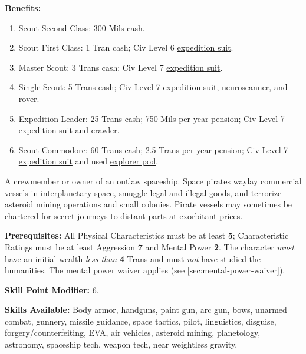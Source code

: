 \pagebreak[2]
\textbf{Benefits:}
\begin{enumerate}
\item Scout Second Class: 300 Mils cash.
\item Scout First Class: 1 Tran cash; Civ Level 6 \hyperlink{tag:expedsuit}{expedition suit}.
\item Master Scout: 3 Trans cash; Civ Level 7 \hyperlink{tag:expedsuit}{expedition suit}.
\item Single Scout: 5 Trans cash; Civ Level 7 \hyperlink{tag:expedsuit}{expedition suit},
  \hypertarget{tag:neuroscanner}{neuroscanner}, and \hypertarget{tag:rover}{rover}.
\item Expedition Leader: 25 Trans cash; 750 Mils per year pension; Civ
  Level 7 \hyperlink{tag:expedsuit}{expedition suit} and \hyperlink{crawler}{crawler}.
\item Scout Commodore: 60 Trans cash; 2.5 Trans per year pension; Civ
  Level 7 \hyperlink{tag:expedsuit}{expedition suit} and used \hyperlink{tag:pod-explorer}{explorer pod}.
\end{enumerate}

\bigskip

\pagebreak[2]

\label{sec:prof-space-pirate}

A crewmember or owner of an outlaw spaceship. Space pirates waylay
commercial vessels in interplanetary space, smuggle legal and illegal
goods, and terrorize asteroid mining operations and small colonies.
Pirate vessels may sometimes be chartered for secret journeys to
distant parts at exorbitant prices.

\textbf{Prerequisites:} All Physical Characteristics must be at least
\textbf{5}; Characteristic Ratings must be at least Aggression
\textbf{7} and Mental Power \textbf{2}. The character \emph{must} have
an initial wealth \emph{less than} \textbf{4} Trans and must
\emph{not} have studied the humanities. The mental power waiver
applies (see \ref{sec:mental-power-waiver}).

\textbf{Skill Point Modifier:} 6.

\textbf{Skills Available:} Body armor, handguns, paint gun, arc gun,
bows, unarmed combat, gunnery, missile guidance, space tactics, pilot,
linguistics, disguise, forgery/counterfeiting, EVA, air vehicles,
asteroid mining, planetology, astronomy, spaceship tech, weapon tech,
near weightless gravity.


